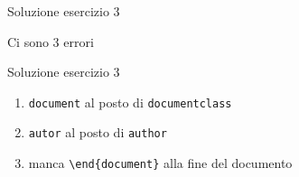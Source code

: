 \begin{frame}{Soluzione esercizio 3}

Ci sono 3 errori
\begin{block}{Soluzione esercizio 3}
\begin{enumerate}
  \item \texttt{document} al posto di \texttt{documentclass}
  \item \texttt{autor} al posto di \texttt{author}
  \item manca \texttt{\textbackslash{}end\{document\}} alla fine del documento
\end{enumerate}
\end{block}

\end{frame}
